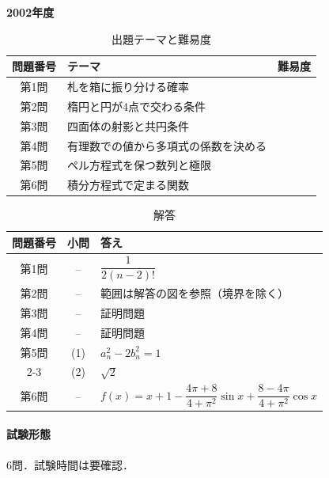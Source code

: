 \documentclass[../../main.tex]{subfiles}
\begin{document}
\begin{center}
  {\fontsize{48pt}{58pt}\selectfont \textbf{2002}\normalsize\textbf{年度}}
\end{center}

\begin{table}[htb]
  \centering
  \caption{出題テーマと難易度}
  \begin{tabular}{|c|p{9cm}|c|}
    \hline
    \textbf{問題番号} & \textbf{テーマ} & \textbf{難易度} \\
    \hline
    第1問 & 札を箱に振り分ける確率 & \\
    \hline
    第2問 & 楕円と円が4点で交わる条件 & \\
    \hline
    第3問 & 四面体の射影と共円条件 & \\
    \hline
    第4問 & 有理数での値から多項式の係数を決める & \\
    \hline
    第5問 & ペル方程式を保つ数列と極限 & \\
    \hline
    第6問 & 積分方程式で定まる関数 & \\
    \hline
  \end{tabular}
\end{table}

\begin{table}[htb]
  \centering
  \caption{解答}
  \renewcommand{\arraystretch}{1.4}
  \begin{tabular}{|c|c|p{9cm}|}
    \hline
    \textbf{問題番号} & \textbf{小問} & \textbf{答え} \\
    \hline
    第1問 & -- & $\dfrac{1}{2(n-2)!}$ \\
    \hline
    第2問 & -- & 範囲は解答の図を参照（境界を除く） \\
    \hline
    第3問 & -- & 証明問題 \\
    \hline
    第4問 & -- & 証明問題 \\
    \hline
    第5問 & (1) & $a_n^2-2b_n^2=1$ \\
    \cline{2-3}
    & (2) & $\sqrt{2}$ \\
    \hline
    第6問 & -- & $f(x)=x+1-\dfrac{4\pi+8}{4+\pi^2}\sin x+\dfrac{8-4\pi}{4+\pi^2}\cos x$ \\
    \hline
  \end{tabular}
\end{table}

\paragraph{試験形態}
6問．試験時間は要確認．
\end{document}
